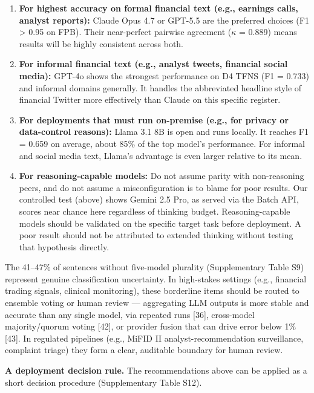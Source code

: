 \documentclass[11pt]{article}
\begin{document}
\begin{enumerate}
\def\labelenumi{\arabic{enumi}.}
\item
  \textbf{For highest accuracy on formal financial text (e.g., earnings
  calls, analyst reports):} Claude Opus 4.7 or GPT-5.5 are the preferred
  choices (F1 \textgreater{} 0.95 on FPB). Their near-perfect pairwise
  agreement ($\kappa$ = 0.889) means results will be highly consistent across
  both.
\item
  \textbf{For informal financial text (e.g., analyst tweets, financial
  social media):} GPT-4o shows the strongest performance on D4 TFNS (F1
  = 0.733) and informal domains generally. It handles the abbreviated
  headline style of financial Twitter more effectively than Claude on
  this specific register.
\item
  \textbf{For deployments that must run on-premise (e.g., for privacy or
  data-control reasons):} Llama 3.1 8B is open and runs locally. It
  reaches F1 = 0.659 on average, about 85\% of the top model's
  performance. For informal and social media text, Llama's advantage is
  even larger relative to its mean.
\item
  \textbf{For reasoning-capable models:} Do not assume parity with
  non-reasoning peers, and do not assume a misconfiguration is to blame
  for poor results. Our controlled test (above) shows Gemini 2.5 Pro, as
  served via the Batch API, scores near chance here regardless of
  thinking budget. Reasoning-capable models should be validated on the
  specific target task before deployment. A poor result should not be
  attributed to extended thinking without testing that hypothesis
  directly.
\end{enumerate}

The 41--47\% of sentences without five-model plurality (Supplementary
Table S9) represent genuine classification uncertainty. In high-stakes
settings (e.g., financial trading signals, clinical monitoring), these
borderline items should be routed to ensemble voting or human review ---
aggregating LLM outputs is more stable and accurate than any single
model, via repeated runs {[}36{]}, cross-model majority/quorum voting
{[}42{]}, or provider fusion that can drive error below 1\% {[}43{]}. In
regulated pipelines (e.g., MiFID II analyst-recommendation surveillance,
complaint triage) they form a clear, auditable boundary for human
review.

\textbf{A deployment decision rule.} The recommendations above can be
applied as a short decision procedure (Supplementary Table S12).
\end{document}
